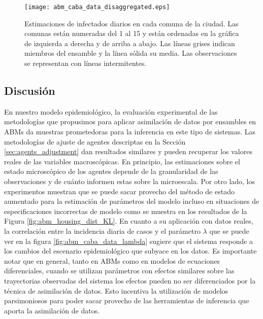 \begin{figure}[h]
    \centering
    \texttt{[image: abm\_caba\_data\_disaggregated.eps]}
    \caption{Estimaciones de infectados diarios en cada comuna de la ciudad. Las comunas están numeradas del 1 al 15 y están ordenadas en la gráfica de izquierda a derecha y de arriba a abajo. Las líneas grises indican miembros del ensamble y la línea sólida su media. Las observaciones se representan con líneas intermitentes.}
    \label{fig:abm_caba_data_disaggregated}
\end{figure}

\subsection{Discusión}

En nuestro modelo epidemiológico, la evaluación experimental de las metodologías que propusimos para aplicar asimilación de datos por ensambles en ABMs da muestras prometedoras para la inferencia en este tipo de sistemas. Las metodologías de ajuste de agentes descriptas en la Sección \ref{sec:agents_adjustment} dan resultados similares y pueden recuperar los valores reales de las variables macroscópicas. En principio, las estimaciones sobre el estado microscópico de los agentes depende de la granularidad de las observaciones y de cuánto informen estas sobre la microescala. Por otro lado, los experimentos muestran que se puede sacar provecho del método de estado aumentado para la estimación de parámetros del modelo incluso en situaciones de especificaciones incorrectas de modelo como se muestra en los resultados de la Figura \ref{fig:abm_housing_dist_KL}. En cuanto a su aplicación con datos reales, la correlación entre la incidencia diaria de casos y el parámetro $\lambda$ que se puede ver en la figura \ref{fig:abm_caba_data_lambda} sugiere que el sistema responde a los cambios del escenario epidemiológico que subyace en los datos. Es importante notar que en general, tanto en ABMs como en modelos de ecuaciones diferenciales, cuando se utilizan parámetros con efectos similares sobre las trayectorias observadas del sistema los efectos pueden no ser diferenciados por la técnica de asimilación de datos. Esto incentiva la utilización de modelos parsimoniosos para poder sacar provecho de las herramientas de inferencia que aporta la asimilación de datos.

